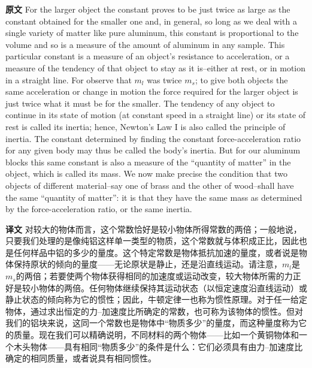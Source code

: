 \documentclass[UTF8,zihao=-4]{ctexart}
\begin{document}
\noindent\textbf{原文} For the larger object the constant proves to be just twice as large as the constant obtained for the smaller one and, in general, so long as we deal with a single variety of matter like pure aluminum, this constant is proportional to the volume and so is a measure of the amount of aluminum in any sample. This particular constant is a measure of an object's resistance to acceleration, or a measure of the tendency of that object to stay as it is--either at rest, or in motion in a straight line. For observe that $m_l$ was twice $m_s$; to give both objects the same acceleration or change in motion the force required for the larger object is just twice what it must be for the smaller. The tendency of any object to continue in its state of motion (at constant speed in a straight line) or its state of rest is called its inertia; hence, Newton's Law I is also called the principle of inertia. The constant determined by finding the constant force-acceleration ratio for any given body may thus be called the body's inertia. But for our aluminum blocks this same constant is also a measure of the ``quantity of matter'' in the object, which is called its mass. We now make precise the condition that two objects of different material--say one of brass and the other of wood--shall have the same ``quantity of matter'': it is that they have the same mass as determined by the force-acceleration ratio, or the same inertia.
\par\noindent\textbf{译文} 对较大的物体而言，这个常数恰好是较小物体所得常数的两倍；一般地说，只要我们处理的是像纯铝这样单一类型的物质，这个常数就与体积成正比，因此也是任何样品中铝的多少的量度。这个特定常数是物体抵抗加速的量度，或者说是物体保持原状的倾向的量度——无论原状是静止，还是沿直线运动。请注意，$m_l$是$m_s$的两倍；若要使两个物体获得相同的加速度或运动改变，较大物体所需的力正好是较小物体的两倍。任何物体继续保持其运动状态（以恒定速度沿直线运动）或静止状态的倾向称为它的惯性；因此，牛顿定律一也称为惯性原理。对于任一给定物体，通过求出恒定的力--加速度比所确定的常数，也可称为该物体的惯性。但对我们的铝块来说，这同一个常数也是物体中“物质多少”的量度，而这种量度称为它的质量。现在我们可以精确说明，不同材料的两个物体——比如一个黄铜物体和一个木头物体——具有相同“物质多少”的条件是什么：它们必须具有由力--加速度比确定的相同质量，或者说具有相同惯性。
\medskip
\end{document}

